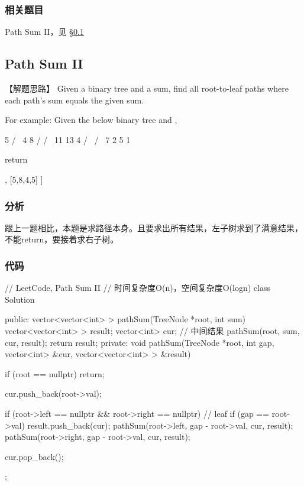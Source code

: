 \subsubsection{相关题目}
\begindot
\item Path Sum II，见 \S \ref{sec:path-sum-ii}
\myenddot


\subsection{Path Sum II}
\label{sec:path-sum-ii}


【解题思路】
Given a binary tree and a sum, find all root-to-leaf paths where each path's sum equals the given sum.

For example:
Given the below binary tree and ,
\begin{Code}
	5
	/ \
	4   8
	/   / \
	11  13  4
	/  \    / \
	7    2  5   1
\end{Code}
return
\begin{Code}
	[
	[5,4,11,2],
	[5,8,4,5]
	]
\end{Code}


\subsubsection{分析}
跟上一题相比，本题是求路径本身。且要求出所有结果，左子树求到了满意结果，不能return，要接着求右子树。

\subsubsection{代码}

\begin{Code}
	// LeetCode, Path Sum II
	// 时间复杂度O(n)，空间复杂度O(logn)
	class Solution {
		public:
		vector<vector<int> > pathSum(TreeNode *root, int sum) {
			vector<vector<int> > result;
			vector<int> cur; // 中间结果
			pathSum(root, sum, cur, result);
			return result;
		}
		private:
		void pathSum(TreeNode *root, int gap, vector<int> &cur,
		vector<vector<int> > &result) {
			if (root == nullptr) return;
			
			cur.push_back(root->val);
			
			if (root->left == nullptr && root->right == nullptr) { // leaf
				if (gap == root->val)
				result.push_back(cur);
			}
			pathSum(root->left, gap - root->val, cur, result);
			pathSum(root->right, gap - root->val, cur, result);
			
			cur.pop_back();
		}
	};
\end{Code}


